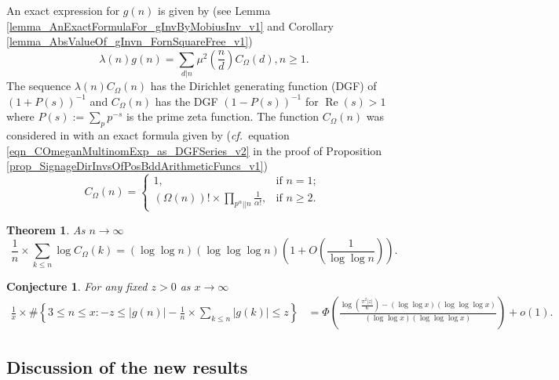 \documentclass[11pt,reqno,a4letter]{article}
\newcommand{\hlocalref}[1]{\hyperref[#1]{\ref{#1}}}
\numberwithin{equation}{section}
\numberwithin{figure}{section}
\numberwithin{table}{section}
\newcommand{\cf}{\textit{cf.\ }}
\theoremstyle{plain}
\newtheorem{theorem}{Theorem}
\numberwithin{theorem}{section}
\newtheorem*{conjecture*}{Conjecture}
\theoremstyle{definition}
\renewcommand{\Re}{\operatorname{Re}}
\begin{document}
An exact expression for $g(n)$ is given by 
(see Lemma \hlocalref{lemma_AnExactFormulaFor_gInvByMobiusInv_v1} and 
Corollary \hlocalref{lemma_AbsValueOf_gInvn_FornSquareFree_v1}) 
\begin{equation}
\label{eqn_gInvn_ExactDivisorSumFormula_WithSgnWeight_v1} 
\lambda(n) g(n) = \sum_{d|n} \mu^2\left(\frac{n}{d}\right) C_{\Omega}(d), n \geq 1. 
\end{equation}
The sequence $\lambda(n) C_{\Omega}(n)$ has the 
Dirichlet generating function (DGF) of $(1 + P(s))^{-1}$ and 
$C_{\Omega}(n)$ has the DGF $(1-P(s))^{-1}$ for $\Re(s) > 1$ 
where $P(s) := \sum_p p^{-s}$ is the prime zeta function. 
The function $C_{\Omega}(n)$ was considered in 
\cite{FROBERG-1968} with an exact formula given by 
(\cf equation \eqref{eqn_COmeganMultinomExp_as_DGFSeries_v2} in the 
proof of Proposition \hlocalref{prop_SignageDirInvsOfPosBddArithmeticFuncs_v1}) 
\begin{equation}
\label{eqn_proof_tag_hInvn_ExactNestedSumFormula_CombInterpetIdent_v3}
C_{\Omega}(n) = \begin{cases}
     1, & \text{if $n = 1$; } \\ 
     (\Omega(n))! \times \prod\limits_{p^{\alpha}||n} \frac{1}{\alpha!}, & \text{if $n \geq 2$. }
     \end{cases}
\end{equation} 

\begin{theorem} 
\label{lemma_HatCAstxSum_ExactFormulaWithError_v1} 
As $n \rightarrow \infty$ 
\[
\frac{1}{n} \times \sum_{k \leq n} \log C_{\Omega}(k) = 
     (\log\log n)(\log\log\log n) \left(1 + 
     O\left(\frac{1}{\log\log n}\right)\right). 
\] 
\end{theorem} 

\begin{conjecture*}
For any fixed $z > 0$ as $x \rightarrow \infty$ 
\begin{align*} 
\frac{1}{x} \times \#\left\{3 \leq n \leq x: -z \leq |g(n)| - 
     \frac{1}{n} \times \sum_{k \leq n} |g(k)| \leq z\right\} & = 
	\Phi\left(\frac{\log\left(\frac{\pi^2 |z|}{6}\right) - (\log\log x) (\log\log\log x)}{ 
	(\log\log x)(\log\log\log x)}\right) + o(1).
\end{align*} 
\end{conjecture*}

\subsection{Discussion of the new results}
\end{document}
